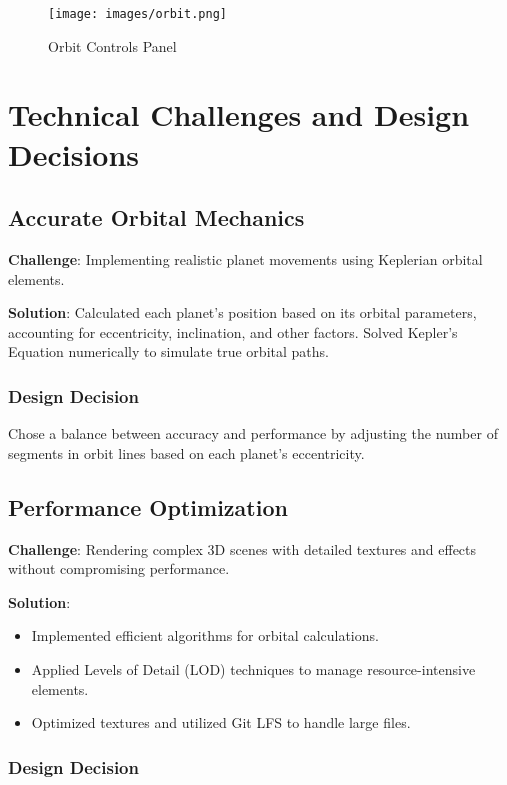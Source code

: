 \documentclass[12pt, a4paper]{article}
\begin{document}
\begin{figure}[H]
    \centering
    \texttt{[image: images/orbit.png]}
    \caption{Orbit Controls Panel}
\end{figure}

\section{Technical Challenges and Design Decisions}

\subsection{Accurate Orbital Mechanics}

\textbf{Challenge}: Implementing realistic planet movements using Keplerian orbital elements.

\textbf{Solution}: Calculated each planet's position based on its orbital parameters, accounting for eccentricity, inclination, and other factors. Solved Kepler's Equation numerically to simulate true orbital paths.

\subsubsection{Design Decision}

Chose a balance between accuracy and performance by adjusting the number of
segments in orbit lines based on each planet's eccentricity.

\subsection{Performance Optimization}

\textbf{Challenge}: Rendering complex 3D scenes with detailed textures and effects without compromising performance.

\textbf{Solution}:

\begin{itemize}
    \item Implemented efficient algorithms for orbital calculations.
    \item Applied Levels of Detail (LOD) techniques to manage resource-intensive
          elements.
    \item Optimized textures and utilized Git LFS to handle large files.
\end{itemize}

\subsubsection{Design Decision}
\end{document}
